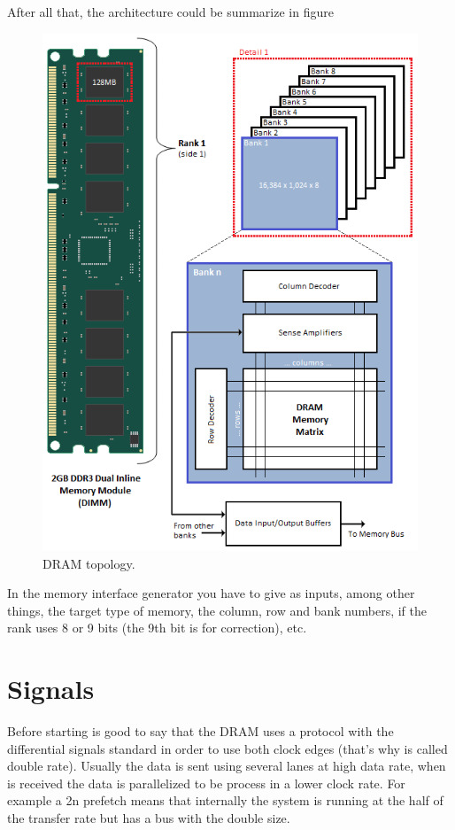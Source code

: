 After all that, the architecture could be summarize in figure 


\begin{figure}
    \centering
    \includegraphics[scale=0.3]{img/dram_topology.png}
    \caption{DRAM topology.}
    \label{fig:dram_topo}
\end{figure}


In the memory interface generator you have to give as inputs, among other things, the target type of memory, the column, row and bank numbers, if the rank uses 8 or 9 bits (the 9th bit is for correction), etc.

\section{Signals}

Before starting is good to say that the DRAM uses a protocol with the differential signals standard in order to use both clock edges (that's why is called double rate). Usually the data is sent using several lanes at high data rate, when is received the data is parallelized to be process in a lower clock rate. For example a 2n prefetch means that internally the system is running at the half of the transfer rate but has a bus with the double size.

